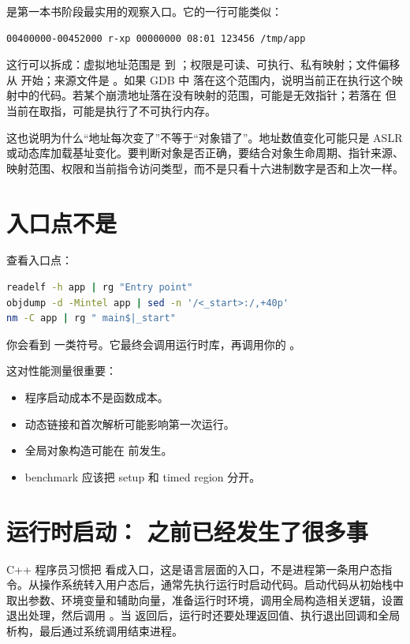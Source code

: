  是第一本书阶段最实用的观察入口。它的一行可能类似：

\begin{lstlisting}[numbers=none,caption={一行进程地址映射的读法}]
00400000-00452000 r-xp 00000000 08:01 123456 /tmp/app
\end{lstlisting}

这行可以拆成：虚拟地址范围是  到 ；权限是可读、可执行、私有映射；文件偏移从  开始；来源文件是 。如果 GDB 中  落在这个范围内，说明当前正在执行这个映射中的代码。若某个崩溃地址落在没有映射的范围，可能是无效指针；若落在  但当前在取指，可能是执行了不可执行内存。

这也说明为什么“地址每次变了”不等于“对象错了”。地址数值变化可能只是 ASLR 或动态库加载基址变化。要判断对象是否正确，要结合对象生命周期、指针来源、映射范围、权限和当前指令访问类型，而不是只看十六进制数字是否和上次一样。

\section{入口点不是 }

查看入口点：

\begin{lstlisting}[language=bash]
readelf -h app | rg "Entry point"
objdump -d -Mintel app | sed -n '/<_start>:/,+40p'
nm -C app | rg " main$|_start"
\end{lstlisting}

你会看到  一类符号。它最终会调用运行时库，再调用你的 。

这对性能测量很重要：

\begin{itemize}
  \item 程序启动成本不是函数成本。
  \item 动态链接和首次解析可能影响第一次运行。
  \item 全局对象构造可能在  前发生。
  \item benchmark 应该把 setup 和 timed region 分开。
\end{itemize}

\section{运行时启动： 之前已经发生了很多事}

C++ 程序员习惯把  看成入口，这是语言层面的入口，不是进程第一条用户态指令。从操作系统转入用户态后，通常先执行运行时启动代码。启动代码从初始栈中取出参数、环境变量和辅助向量，准备运行时环境，调用全局构造相关逻辑，设置退出处理，然后调用 。当  返回后，运行时还要处理返回值、执行退出回调和全局析构，最后通过系统调用结束进程。

